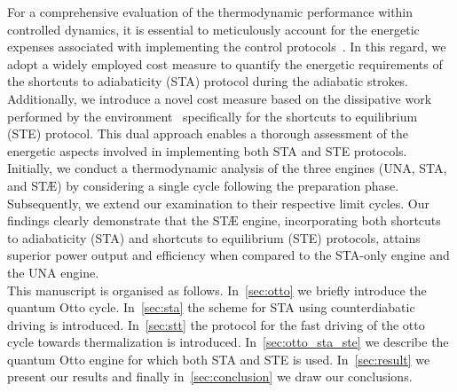 \documentclass[aps,pra,twocolumn,showpacs,showkeys,groupedaddress,nobalancelastpage,nofootinbib,floatfix,superscriptaddress,longbibliography]{revtex4-2}
\begin{document}
For a comprehensive evaluation of the thermodynamic performance within controlled dynamics, it is essential to meticulously account for the energetic expenses associated with implementing the control protocols~\cite{PhysRevE.99.032108,PhysRevE.98.032121,PhysRevE.99.022110,PhysRevResearch.2.023145}. In this regard, we adopt a widely employed cost measure to quantify the energetic requirements of the shortcuts to adiabaticity (STA) protocol during the adiabatic strokes. Additionally, we introduce a novel cost measure based on the dissipative work performed by the environment~\cite{PhysRevA.105.L040201} specifically for the shortcuts to equilibrium (STE) protocol. This dual approach enables a thorough assessment of the energetic aspects involved in implementing both STA and STE protocols.\\

Initially, we conduct a thermodynamic analysis of the three engines (UNA, STA, and ST{\AE}) by considering a single cycle following the preparation phase. Subsequently, we extend our examination to their respective limit cycles. Our findings clearly demonstrate that the ST{\AE} engine, incorporating both shortcuts to adiabaticity (STA) and shortcuts to equilibrium (STE) protocols, attains superior power output and efficiency when compared to the STA-only engine and the UNA engine.\\

This manuscript is organised as follows. In~\cref{sec:otto} we briefly introduce the quantum Otto cycle. In~\cref{sec:sta} the scheme for STA using counterdiabatic driving is introduced. In~\cref{sec:stt} the protocol for the fast driving of the otto cycle towards thermalization is introduced. In~\cref{sec:otto_sta_ste} we describe the quantum Otto engine for which both STA and STE is used. In~\cref{sec:result} we present our results and finally in~\cref{sec:conclusion} we draw our conclusions.
\end{document}
